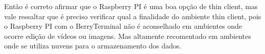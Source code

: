 \documentclass[
	12pt,				%
	openright,			%
	twoside,			%
	a4paper,			%
	chapter=TITLE,		%
	english,			%
	brazil				%
	]{abntex2}
\begin{document}
Então é correto afirmar que o Raspberry PI é uma boa opção de thin client, mas vale ressaltar que é preciso verificar qual a finalidade do ambiente thin client, pois o Raspberry PI com o BerryTerminal não é aconselhado em ambientes onde ocorre edição de vídeos ou imagens. Mas altamente recomentado em ambientes onde se utiliza nuvens para o armazenamento dos dados.








\postextual







\end{document}
